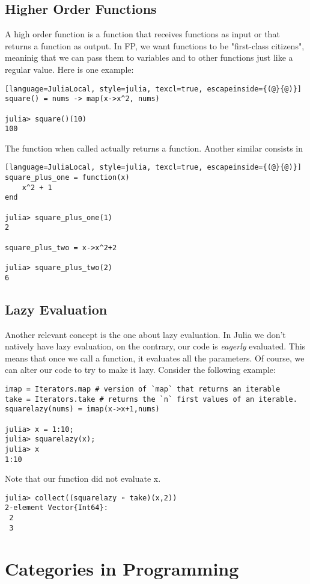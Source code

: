 \subsection{Higher Order Functions}

A high order function is a function that receives functions as input or that returns a function as output.
In FP, we want functions to be "first-class citizens", meaninig that we can pass them to variables and to other
functions just like a regular value.
Here is one example:

\bigskip
\begin{lstlisting}[language=JuliaLocal, style=julia, texcl=true, escapeinside={(@}{@)}]
square() = nums -> map(x->x^2, nums)

julia> square()(10)
100
\end{lstlisting}

The function  when called actually returns a function.
Another similar consists in
\bigskip
\begin{lstlisting}[language=JuliaLocal, style=julia, texcl=true, escapeinside={(@}{@)}]
square_plus_one = function(x)
    x^2 + 1
end

julia> square_plus_one(1)
2

square_plus_two = x->x^2+2

julia> square_plus_two(2)
6
\end{lstlisting}

\subsection{Lazy Evaluation}

Another relevant concept is the one about lazy evaluation.
In Julia we don't natively have lazy evaluation, on the contrary,
our code is \textit{eagerly} evaluated.
This means that once we call a function, it evaluates all the parameters.
Of course, we can alter our code to try to make it lazy. Consider the following example:

\bigskip
\begin{lstlisting}[language=JuliaLocal, style=julia, texcl=true]
imap = Iterators.map # version of `map` that returns an iterable
take = Iterators.take # returns the `n` first values of an iterable.
squarelazy(nums) = imap(x->x+1,nums)

julia> x = 1:10;
julia> squarelazy(x);
julia> x
1:10
\end{lstlisting}

Note that our function did not evaluate x.
\bigskip
\begin{lstlisting}[language=JuliaLocal, style=julia, texcl=true]
julia> collect((squarelazy ∘ take)(x,2))
2-element Vector{Int64}:
 2
 3
\end{lstlisting}

\section{Categories in Programming}


